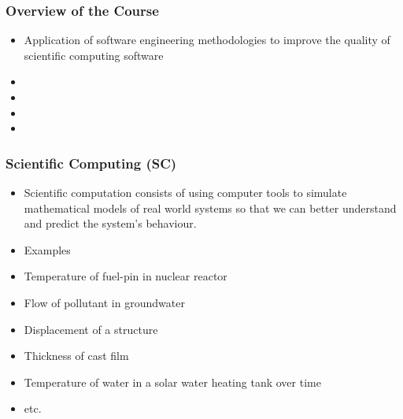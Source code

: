 \documentclass[t,12pt,numbers,fleqn]{beamer}
\begin{document}

\begin{frame}
\frametitle{Overview of the Course}

\begin{itemize}

\item Application of software engineering methodologies to improve the quality
  of scientific computing software
\item {}
\item {}
\item {}
\item {}

\end{itemize}

\end{frame}


\begin{frame}
\frametitle{Scientific Computing (SC)}

\begin{itemize}

\item Scientific computation consists of using computer tools to simulate
  mathematical models of real world systems so that we can better understand and
  predict the system’s behaviour.
\item Examples
\bi
\item Temperature of fuel-pin in nuclear reactor
\item Flow of pollutant in groundwater
\item Displacement of a structure
\item Thickness of cast film
\item Temperature of water in a solar water heating tank over time
\item etc.
\ei
\end{itemize}

\end{frame}

\end{document}
